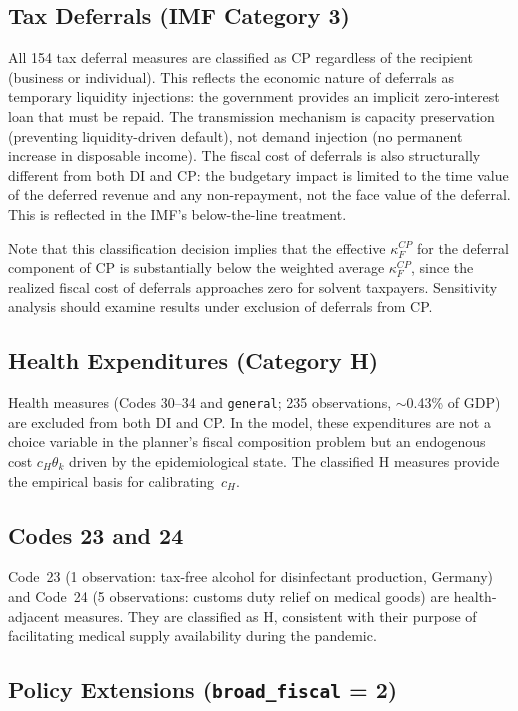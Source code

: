 \documentclass[12pt,a4paper]{article}
\begin{document}
\subsection{Tax Deferrals (IMF Category 3)}

All 154 tax deferral measures are classified as CP regardless of the recipient
(business or individual). This reflects the economic nature of deferrals as
temporary liquidity injections: the government provides an implicit zero-interest
loan that must be repaid. The transmission mechanism is capacity preservation
(preventing liquidity-driven default), not demand injection (no permanent increase
in disposable income). The fiscal cost of deferrals is also structurally different
from both DI and CP: the budgetary impact is limited to the time value of the
deferred revenue and any non-repayment, not the face value of the deferral. This
is reflected in the IMF's below-the-line treatment.

Note that this classification decision implies that the effective $\kappa_F^{CP}$
for the deferral component of CP is substantially below the weighted average
$\kappa_F^{CP}$, since the realized fiscal cost of deferrals approaches zero for
solvent taxpayers. Sensitivity analysis should examine results under exclusion of
deferrals from CP.

\subsection{Health Expenditures (Category H)}

Health measures (Codes 30--34 and \texttt{general}; 235 observations, $\sim$0.43\% of
GDP) are excluded from both DI and CP. In the model, these expenditures are not a
choice variable in the planner's fiscal composition problem but an endogenous cost
$c_H \theta_k$ driven by the epidemiological state. The classified H measures
provide the empirical basis for calibrating~$c_H$.

\subsection{Codes 23 and 24}

Code~23 (1 observation: tax-free alcohol for disinfectant production, Germany) and
Code~24 (5 observations: customs duty relief on medical goods) are health-adjacent
measures. They are classified as H, consistent with their purpose of facilitating
medical supply availability during the pandemic.

\subsection{Policy Extensions (\texttt{broad\_fiscal} = 2)}
\end{document}
